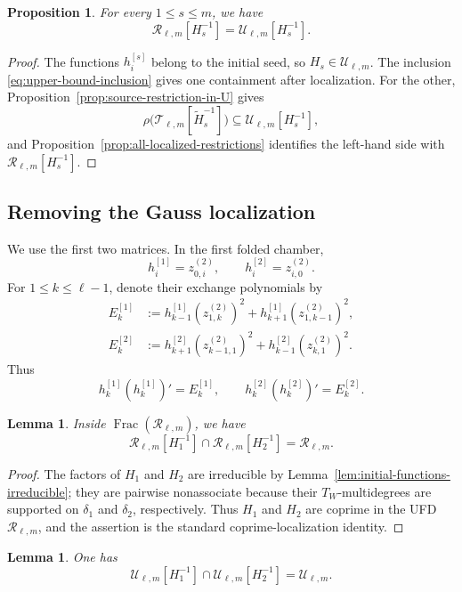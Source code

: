 \documentclass[11pt]{amsart}
\newtheorem{proposition}[theorem]{Proposition}
\newtheorem{lemma}[theorem]{Lemma}
\theoremstyle{definition}
\theoremstyle{remark}
\newcommand{\cR}{\mathcal R}
\newcommand{\cT}{\mathcal T}
\newcommand{\cU}{\mathcal U}
\newcommand{\Frac}{\operatorname{Frac}}
\begin{document}
\begin{proposition}
\label{prop:localized-equality}
For every $1\le s\le m$, we have
\[ \cR_{\ell,m}[H_s^{-1}] =\cU_{\ell,m}[H_s^{-1}]. \]
\end{proposition}

\begin{proof}
The functions $h_i^{[s]}$ belong to the initial seed, so $H_s\in\cU_{\ell,m}$.
The inclusion \eqref{eq:upper-bound-inclusion} gives one containment after
localization.  For the other, Proposition~\ref{prop:source-restriction-in-U}
gives
\[ \rho\bigl(\cT_{\ell,m}[\widetilde H_s^{-1}]\bigr) \subseteq\cU_{\ell,m}[H_s^{-1}], \]
and Proposition~\ref{prop:all-localized-restrictions} identifies the
left-hand side with $\cR_{\ell,m}[H_s^{-1}]$.
\end{proof}

\subsection{Removing the Gauss localization}
\label{subsec:remove-gaussian-localization}

We use the first two matrices.  In the first folded chamber,
\[ h_i^{[1]}=z_{0,i}^{(2)}, \qquad h_i^{[2]}=z_{i,0}^{(2)}. \]
For $1\le k\le\ell-1$, denote their exchange polynomials by
\begin{align*}
 E_k^{[1]}
 &:=h_{k-1}^{[1]}(z_{1,k}^{(2)})^2
   +h_{k+1}^{[1]}(z_{1,k-1}^{(2)})^2,\\
 E_k^{[2]}
 &:=h_{k+1}^{[2]}(z_{k-1,1}^{(2)})^2
   +h_{k-1}^{[2]}(z_{k,1}^{(2)})^2.
\end{align*}
Thus
\[ h_k^{[1]}(h_k^{[1]})'=E_k^{[1]}, \qquad h_k^{[2]}(h_k^{[2]})'=E_k^{[2]}. \]

\begin{lemma}
\label{lem:R-localization-intersection}
Inside $\Frac(\cR_{\ell,m})$, we have
\[ \cR_{\ell,m}[H_1^{-1}] \cap\cR_{\ell,m}[H_2^{-1}] =\cR_{\ell,m}. \]
\end{lemma}

\begin{proof}
The factors of $H_1$ and $H_2$ are irreducible by
Lemma~\ref{lem:initial-functions-irreducible}; they are pairwise
nonassociate because their $T_W$-multidegrees are supported on
$\delta_1$ and $\delta_2$, respectively.  Thus $H_1$ and $H_2$
are coprime in the UFD $\cR_{\ell,m}$, and the assertion is the standard
coprime-localization identity.
\end{proof}

\begin{lemma}
\label{lem:U-localization-intersection}
One has
\[ \cU_{\ell,m}[H_1^{-1}] \cap\cU_{\ell,m}[H_2^{-1}] =\cU_{\ell,m}. \]
\end{lemma}
\end{document}
